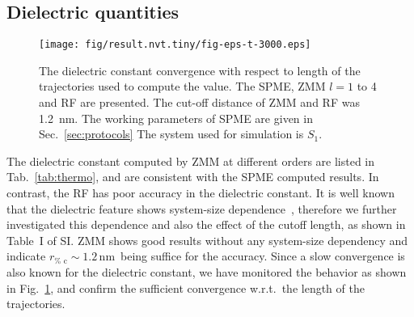 \documentclass[a4paper,preprint,unsortedaddress,onecolumn,fleqn]{revtex4}
\newcommand{\systemlb}{L_1}
\begin{document}

\subsection{Dielectric quantities}

\begin{figure}[tbp]
\centering
\texttt{[image: fig/result.nvt.tiny/fig-eps-t-3000.eps]}
\caption{The dielectric constant convergence with respect to length of the
trajectories used to compute the value. The SPME, ZMM $l=1$ to 4 and RF are
presented. The cut-off distance of ZMM and RF was 1.2~nm. The working
parameters of SPME are given in Sec.~\protect\ref{sec:protocols} The system
used for simulation is $S_{1}$.}
\label{fig:eps-conv}
\end{figure}

The dielectric constant computed by ZMM at different orders are listed in
Tab.~\ref{tab:thermo}, and are consistent with the SPME computed results. In
contrast, the RF has poor accuracy in the dielectric constant. It is well
known that the dielectric feature shows system-size dependence~\cite%
{vanderSpoel2006origin}, therefore we further investigated this dependence
and also the effect of the cutoff length, as shown in Table~I of SI. ZMM
shows good results without any system-size dependency and indicate $r_{\text{%
c}}\sim 1.2\,$nm\ being suffice for the accuracy. Since a slow convergence
is also known for the dielectric constant, we have monitored the behavior as
shown in Fig.~\ref{fig:eps-conv}, and confirm the sufficient convergence
w.r.t.~the length of the trajectories.
\end{document}
